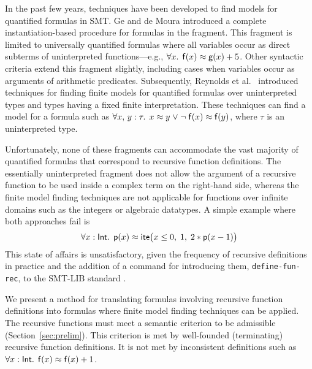 In the past few years, techniques have been developed to find models for
quantified formulas in SMT.
Ge and de Moura \cite{GeDeM-CAV-09} introduced a complete instantiation-based
procedure for formulas in the  fragment.
This fragment is limited to universally quantified formulas where all
variables occur as direct subterms of uninterpreted
functions---e.g., $\forall x%
.\;\, \con{f}( x )
\teq \con{g}( x ) + 5$.
Other syntactic criteria extend
this fragment slightly, including cases when variables occur as arguments of
arithmetic predicates. Subsequently, Reynolds et al.\
\cite{ReyEtAl-1-RR-13,reynolds-et-al-2013} introduced techniques for finding finite
models for quantified
formulas over uninterpreted types and types having a fixed finite
interpretation. %
These techniques can
find a model for a formula such as $\forall x,\, y : \tau.\;\, x \teq
y \vee \allowbreak \neg \con{f}( x ) \teq \con{f}( y )$, where $\tau$ is an uninterpreted type.

Unfortunately, none of these fragments can accommodate the vast majority of
quantified formulas that correspond to recursive function definitions. The
essentially uninterpreted fragment does not allow the argument of a
recursive function to be used inside a complex term on the right-hand side,
whereas the finite model finding techniques %
are not applicable for functions over infinite domains such as the integers or
algebraic datatypes. A simple example where both approaches fail is
$$\forall x : {\mathsf{Int}}.\;\,
\mathsf{p}( x ) \approx \mathsf{ite}\bigl( x \leq 0,\allowbreak\;  1,\allowbreak\;
  2 * \mathsf{p}( x - 1 ) \bigr)$$ %
This state of affairs is unsatisfactory, given the frequency of
recursive definitions in practice and the %
addition of a %
command for introducing them, \texttt{define-fun-rec},
to the SMT-LIB standard \cite{smtlib25}.

We present a method for translating formulas involving recursive function
definitions into formulas where finite model finding techniques can be applied.
The recursive functions must meet a semantic criterion to be admissible
(Section~\ref{sec:prelim}). This criterion is met by well-founded (terminating)
recursive function definitions. It is not met by inconsistent
definitions such as \,$\forall x : {\mathsf{Int}}.\;\, \mathsf{f}(x) \approx \mathsf{f}(x) +
1$.


